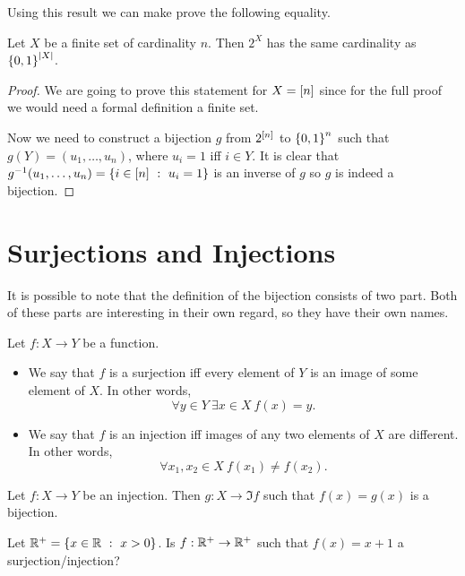 Using this result we can make prove the following equality.
\begin{corollary}
\label{corollary:power-set-and-set-of-binary-strings}
    Let $X$ be a finite set of cardinality $n$. Then $2^X$ has the same
    cardinality as $\set{0, 1}^{\cardinality{X}}$.
\end{corollary}
\begin{proof}
  We are going to prove this statement for $X = {[{n}]}$ since for the full
  proof we would need a formal definition a finite set.

  Now we need to construct a bijection $g$ from $2^{{[{n}]}}$ to
  $\set{0, 1}^n$ such that $g(Y) = (u_1, \dots, u_n)$, where $u_i = 1$ iff $i \in Y$.
  It is clear that $g^{-1}(u_1, \dots, u_n) = \set[u_i = 1]{i \in \range{n}}$ is an
  inverse of $g$ so $g$ is indeed a bijection.
\end{proof}

\section{Surjections and Injections}

It is possible to note that the definition of the bijection consists of two part.
Both of these parts are interesting in their own regard, so they have their own
names.
\begin{definition}
  Let $f : X \to Y$ be a function.
  \begin{itemize}
    \item We say that $f$ is a surjection iff every element of $Y$ is an image
      of some element of $X$. In other words,
      \[
        \forall y \in Y~\exists x \in X\ f(x) = y.
      \]
      \item We say that $f$ is an injection iff images of any two elements
        of $X$ are different. In other words,
        \[
          \forall x_1, x_2 \in X\ f(x_1) \neq f(x_2).
        \]
  \end{itemize}
\end{definition}

\begin{remark}
  Let $f : X \to Y$ be an injection. Then $g : X \to \Im f$ such that
  $f(x) = g(x)$ is a bijection.
\end{remark}

\begin{exercise}
  Let $\R^+ = \set[x > 0]{x \in \R}$. Is $f : {\mathbb{R}}^+ \to {\mathbb{R}}^+$ such that
  $f(x) = x + 1$ a surjection/injection?
\end{exercise}

